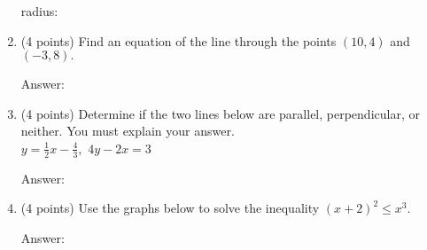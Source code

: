 \documentclass[11pt]{article}
\begin{document}
\begin{enumerate}
\begin{flushright}{radius: \underline{\hspace{2in}}}\end{flushright}

\item (4 points) Find an equation of the line through the points $(10,4)$ and $(-3,8).$

\begin{flushright}{Answer: \underline{\hspace{2in}}}\end{flushright}
\vfill

\item (4 points) Determine if the two lines below are parallel, perpendicular, or neither. You must explain your answer.\\
$y=\frac{1}{2}x-\frac{4}{3},$ \hspace{.3in} $4y-2x=3$
\begin{flushright}{Answer: \underline{\hspace{2in}}}\end{flushright}
\vfill

\item (4 points) Use the graphs below to solve the inequality $(x+2)^2 \leq x^3.$\\
\begin{flushright}{Answer: \underline{\hspace{2in}}}\end{flushright}

\end{enumerate}
\end{document}
